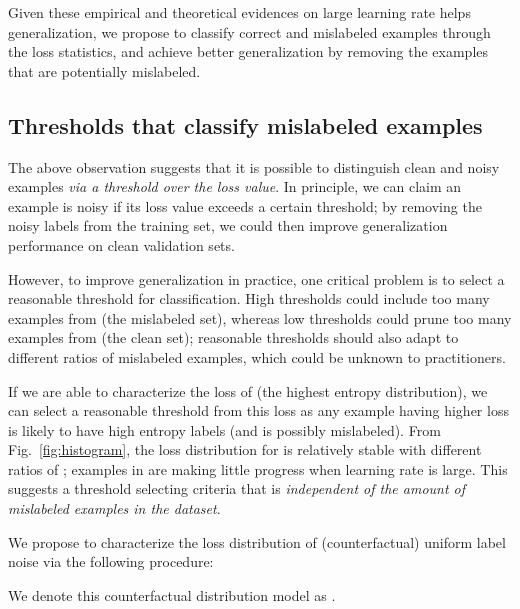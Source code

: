 \documentclass[a4paper,11pt]{article}
\begin{document}
Given these empirical and theoretical evidences on large learning rate helps generalization, we propose to classify correct and mislabeled examples through the loss statistics, and achieve better generalization by removing the examples that are potentially mislabeled.









\subsection{Thresholds that classify mislabeled examples}
The above observation suggests that it is possible to distinguish clean and noisy examples \textit{via a threshold over the loss value}. In principle, we can claim an example is noisy if its loss value exceeds a certain threshold; by removing the noisy labels from the training set, we could then improve generalization performance on clean validation sets.

However, to improve generalization in practice, one critical problem is to select a reasonable threshold for classification. High thresholds could include too many examples from  (the mislabeled set), whereas low thresholds could prune too many examples from  (the clean set); reasonable thresholds should also adapt to different ratios of mislabeled examples, which could be unknown to practitioners. 



If we are able to characterize the loss of  (the highest entropy distribution), we can select a reasonable threshold from this loss as any example having higher loss is likely to have high entropy labels (and is possibly mislabeled).
From Fig.~\ref{fig:histogram}, the loss distribution for  is relatively stable with different ratios of ; examples in  are making little progress when learning rate is large. This suggests a threshold selecting criteria that is \textit{independent of the amount of mislabeled examples in the dataset}.

We propose to characterize the loss distribution of (counterfactual) uniform label noise via the following procedure:

We denote this counterfactual distribution model as .
\end{document}
